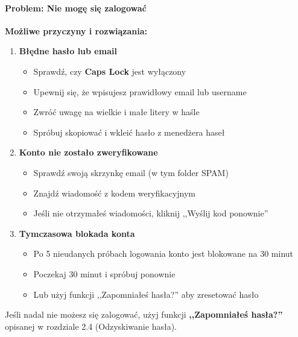 \documentclass[12pt,a4paper]{article}
\begin{document}
\paragraph{Problem: Nie mogę się zalogować}

\textbf{Możliwe przyczyny i rozwiązania:}

\begin{enumerate}
    \item \textbf{Błędne hasło lub email}
    \begin{itemize}
        \item Sprawdź, czy \textbf{Caps Lock} jest wyłączony
        \item Upewnij się, że wpisujesz prawidłowy email lub username
        \item Zwróć uwagę na wielkie i małe litery w haśle
        \item Spróbuj skopiować i wkleić hasło z menedżera haseł
    \end{itemize}
    
    \item \textbf{Konto nie zostało zweryfikowane}
    \begin{itemize}
        \item Sprawdź swoją skrzynkę email (w tym folder SPAM)
        \item Znajdź wiadomość z kodem weryfikacyjnym
        \item Jeśli nie otrzymałeś wiadomości, kliknij ,,Wyślij kod ponownie''
    \end{itemize}
    
    \item \textbf{Tymczasowa blokada konta}
    \begin{itemize}
        \item Po 5 nieudanych próbach logowania konto jest blokowane na 30 minut
        \item Poczekaj 30 minut i spróbuj ponownie
        \item Lub użyj funkcji ,,Zapomniałeś hasła?'' aby zresetować hasło
    \end{itemize}
\end{enumerate}

\begin{tcolorbox}[colback=green!5!white,colframe=green!75!black,title=\faLightbulb\ Rozwiązanie]
Jeśli nadal nie możesz się zalogować, użyj funkcji \textbf{,,Zapomniałeś hasła?''} opisanej w rozdziale 2.4 (Odzyskiwanie hasła).
\end{tcolorbox}
\end{document}
